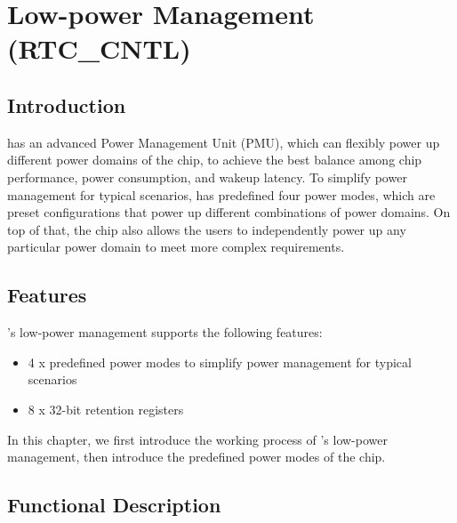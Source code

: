 \documentclass[main\_\_EN.tex]{subfiles}
\begin{document}

\ifglobal
\else
    {\let\clearpage\relax \listoftodos}
    \tableofcontents
\fi



\hypertarget{lowpowm}{}
\chapter{Low-power Management (RTC\_CNTL)}\label{mod:lowpowm}

\section{Introduction}

\chipname{} has an advanced Power Management Unit (PMU), which can flexibly power up different power domains of the chip, to achieve the best balance among chip performance, power consumption, and wakeup latency. To simplify power management for typical scenarios, \chipname{} has predefined four power modes, which are preset configurations that power up different combinations of power domains. On top of that, the chip also allows the users to independently power up any particular power domain to meet more complex requirements.

\section{Features}
\chipname{}'s low-power management supports the following features:
\begin{itemize}
    \item 4 x predefined power modes to simplify power management for typical scenarios
    \item 8 x 32-bit retention registers
\end{itemize}

In this chapter, we first introduce the working process of \chipname{}'s low-power management, then introduce the predefined power modes of the chip.

\section{Functional Description}
\end{document}
